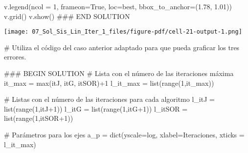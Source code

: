 \documentclass[
  letterpaper,
  DIV=11,
  numbers=noendperiod]{scrreprt}
\newenvironment{Shaded}{\begin{snugshade}}{\end{snugshade}}
\newcommand{\BuiltInTok}[1]{\textcolor[rgb]{0.00,0.23,0.31}{#1}}
\newcommand{\CommentTok}[1]{\textcolor[rgb]{0.37,0.37,0.37}{#1}}
\newcommand{\DecValTok}[1]{\textcolor[rgb]{0.68,0.00,0.00}{#1}}
\newcommand{\FloatTok}[1]{\textcolor[rgb]{0.68,0.00,0.00}{#1}}
\newcommand{\NormalTok}[1]{\textcolor[rgb]{0.00,0.23,0.31}{#1}}
\newcommand{\OperatorTok}[1]{\textcolor[rgb]{0.37,0.37,0.37}{#1}}
\newcommand{\RegionMarkerTok}[1]{\textcolor[rgb]{0.00,0.23,0.31}{#1}}
\newcommand{\StringTok}[1]{\textcolor[rgb]{0.13,0.47,0.30}{#1}}
\newcommand{\VariableTok}[1]{\textcolor[rgb]{0.07,0.07,0.07}{#1}}
\begin{document}
\begin{Shaded}
\begin{Highlighting}[]
\NormalTok{v.legend(ncol }\OperatorTok{=} \DecValTok{1}\NormalTok{, frameon}\OperatorTok{=}\VariableTok{True}\NormalTok{, loc}\OperatorTok{=}\StringTok{\textquotesingle{}best\textquotesingle{}}\NormalTok{, bbox\_to\_anchor}\OperatorTok{=}\NormalTok{(}\FloatTok{1.78}\NormalTok{, }\FloatTok{1.01}\NormalTok{))}
\NormalTok{v.grid()}
\NormalTok{v.show()}
\CommentTok{\#\#\# }\RegionMarkerTok{END}\CommentTok{ SOLUTION}
\end{Highlighting}
\end{Shaded}

\texttt{[image: 07\_Sol\_Sis\_Lin\_Iter\_1\_files/figure-pdf/cell-21-output-1.png]}

\begin{Shaded}
\begin{Highlighting}[]
\CommentTok{\# Utiliza el código del caso anterior adaptado para que pueda graficar los tres errores.}

\CommentTok{\#\#\# }\RegionMarkerTok{BEGIN}\CommentTok{ SOLUTION}
\CommentTok{\# Lista con el número de las iteraciones máxima}
\NormalTok{it\_max }\OperatorTok{=} \BuiltInTok{max}\NormalTok{(itJ, itG, itSOR)}\OperatorTok{+}\DecValTok{1}
\NormalTok{l\_it\_max }\OperatorTok{=} \BuiltInTok{list}\NormalTok{(}\BuiltInTok{range}\NormalTok{(}\DecValTok{1}\NormalTok{,it\_max)) }

\CommentTok{\# Listas con el número de las iteraciones para cada algoritmo}
\NormalTok{l\_itJ }\OperatorTok{=} \BuiltInTok{list}\NormalTok{(}\BuiltInTok{range}\NormalTok{(}\DecValTok{1}\NormalTok{,itJ}\OperatorTok{+}\DecValTok{1}\NormalTok{)) }
\NormalTok{l\_itG }\OperatorTok{=} \BuiltInTok{list}\NormalTok{(}\BuiltInTok{range}\NormalTok{(}\DecValTok{1}\NormalTok{,itG}\OperatorTok{+}\DecValTok{1}\NormalTok{)) }
\NormalTok{l\_itSOR }\OperatorTok{=} \BuiltInTok{list}\NormalTok{(}\BuiltInTok{range}\NormalTok{(}\DecValTok{1}\NormalTok{,itSOR}\OperatorTok{+}\DecValTok{1}\NormalTok{)) }

\CommentTok{\# Parámetros para los ejes}
\NormalTok{a\_p }\OperatorTok{=} \BuiltInTok{dict}\NormalTok{(yscale}\OperatorTok{=}\StringTok{\textquotesingle{}log\textquotesingle{}}\NormalTok{, xlabel}\OperatorTok{=}\StringTok{\textquotesingle{}Iteraciones\textquotesingle{}}\NormalTok{, xticks }\OperatorTok{=}\NormalTok{ l\_it\_max)}


\end{Highlighting}
\end{Shaded}
\end{document}
